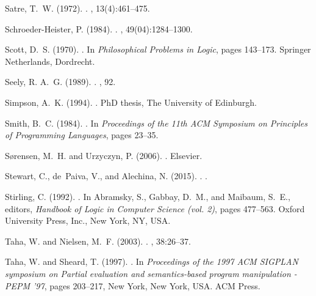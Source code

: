 \documentclass[a4paper]{amsart}
\begin{document}
\begin{thebibliography}{}
Satre, T.~W. (1972).
.
, 13(4):461--475.

Schroeder-Heister, P. (1984).
.
, 49(04):1284--1300.

Scott, D.~S. (1970).
.
\newblock In {\em Philosophical Problems in Logic}, pages 143--173. Springer
  Netherlands, Dordrecht.

Seely, R. A.~G. (1989).
.
, 92.

Simpson, A.~K. (1994).
.
\newblock PhD thesis, The University of Edinburgh.

Smith, B.~C. (1984).
.
\newblock In {\em Proceedings of the 11th ACM Symposium on Principles of
  Programming Languages}, pages 23--35.

S{\o}rensen, M.~H. and Urzyczyn, P. (2006).
.
\newblock Elsevier.

Stewart, C., de~Paiva, V., and Alechina, N. (2015).
.
.

Stirling, C. (1992).
.
\newblock In Abramsky, S., Gabbay, D.~M., and Maibaum, S.~E., editors, {\em
  Handbook of Logic in Computer Science (vol. 2)}, pages 477--563. Oxford
  University Press, Inc., New York, NY, USA.

Taha, W. and Nielsen, M.~F. (2003).
.
, 38:26--37.

Taha, W. and Sheard, T. (1997).
.
\newblock In {\em Proceedings of the 1997 ACM SIGPLAN symposium on Partial
  evaluation and semantics-based program manipulation - PEPM '97}, pages
  203--217, New York, New York, USA. ACM Press.


\end{thebibliography}
\end{document}
